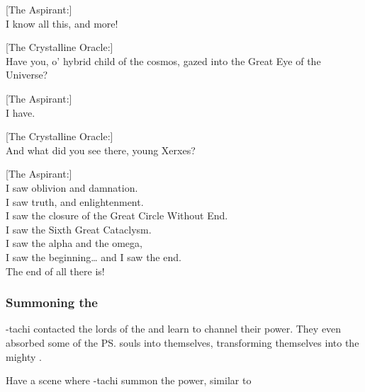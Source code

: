{  [The Aspirant:]\\
  I know all this, and more!
  
  [The Crystalline Oracle:]\\
  Have you, o' hybrid child of the cosmos, gazed into the Great Eye of the Universe?
  
  [The Aspirant:]\\
  I have.
  
  [The Crystalline Oracle:]\\
  And what did you see there, young Xerxes?
  
  [The Aspirant:]\\
  I saw oblivion and damnation.\\
  I saw truth, and enlightenment.\\
  I saw the closure of the Great Circle Without End.\\
  I saw the Sixth Great Cataclysm.\\
  I saw the alpha and the omega, \\
  I saw the beginning\ldots{} and I saw the end.\\
  The end of all there is!
}





\subsubsection{Summoning the \xzaishanns}
\Sethicus-tachi contacted the lords of the \xzaishanns{} and learn to channel their power. 
They even absorbed some of the \ps{\xzaishanns} souls into themselves, transforming themselves into the mighty \draecchonosh. 

Have a scene where \Sethicus-tachi summon the \xzaishannic{} power, similar to 


